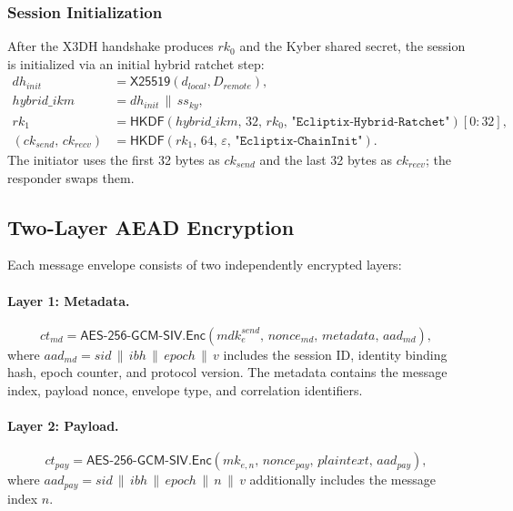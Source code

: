 \documentclass[11pt,a4paper]{article}
\theoremstyle{definition}
\newcommand{\HKDF}{\textsf{HKDF}}
\newcommand{\AEAD}{\textsf{AES-256-GCM-SIV}}
\newcommand{\DH}{\textsf{X25519}}
\newcommand{\Enc}{\textsf{Enc}}
\newcommand{\concat}{\,\|\,}
\newcommand{\rk}{\mathit{rk}}
\newcommand{\ck}{\mathit{ck}}
\newcommand{\mk}{\mathit{mk}}
\newcommand{\mdk}{\mathit{mdk}}
\newcommand{\epoch}{\mathit{epoch}}
\begin{document}
\subsubsection{Session Initialization}

After the X3DH handshake produces $\rk_0$ and the Kyber shared secret, the session is initialized via an initial hybrid ratchet step:
\begin{align}
  \mathit{dh}_{\mathit{init}} &= \DH(d_{\mathit{local}}, D_{\mathit{remote}}), \\
  \mathit{hybrid\_ikm} &= \mathit{dh}_{\mathit{init}} \concat \mathit{ss}_{\mathit{ky}}, \\
  \rk_1 &= \HKDF(\mathit{hybrid\_ikm},\, 32,\, \rk_0,\, \texttt{"Ecliptix-Hybrid-Ratchet"})[0{:}32], \\
  (\ck_{\mathit{send}},\, \ck_{\mathit{recv}}) &= \HKDF(\rk_1,\, 64,\, \varepsilon,\, \texttt{"Ecliptix-ChainInit"}).
\end{align}
The initiator uses the first 32 bytes as $\ck_{\mathit{send}}$ and the last 32 bytes as $\ck_{\mathit{recv}}$; the responder swaps them.

\subsection{Two-Layer AEAD Encryption}\label{sec:two-layer}

Each message envelope consists of two independently encrypted layers:

\paragraph{Layer 1: Metadata.}
\[
  \mathit{ct}_{\mathit{md}} = \AEAD.\Enc(\mdk_e^{\mathit{send}},\, \mathit{nonce}_{\mathit{md}},\, \mathit{metadata},\, \mathit{aad}_{\mathit{md}}),
\]
where $\mathit{aad}_{\mathit{md}} = \mathit{sid} \concat \mathit{ibh} \concat \epoch \concat v$ includes the session ID, identity binding hash, epoch counter, and protocol version. The metadata contains the message index, payload nonce, envelope type, and correlation identifiers.

\paragraph{Layer 2: Payload.}
\[
  \mathit{ct}_{\mathit{pay}} = \AEAD.\Enc(\mk_{e,n},\, \mathit{nonce}_{\mathit{pay}},\, \mathit{plaintext},\, \mathit{aad}_{\mathit{pay}}),
\]
where $\mathit{aad}_{\mathit{pay}} = \mathit{sid} \concat \mathit{ibh} \concat \epoch \concat n \concat v$ additionally includes the message index $n$.
\end{document}
